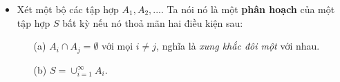 \begin{itemize}
    \item Xét một bộ các tập hợp $A_1, A_2, ...$. Ta nói nó là một \textbf{phân hoạch} của một tập hợp $S$ bất kỳ nếu nó thoả mãn hai điều kiện sau:
    \begin{itemize}
        \item[(a)] $A_i \cap A_j = \emptyset$ với mọi $i \neq j$, nghĩa là 
        \textit{xung khắc đôi một} với nhau.
        \item[(b)] $S = \cup_{i=1}^{\infty} A_i$.
    \end{itemize}
    
\end{itemize}








